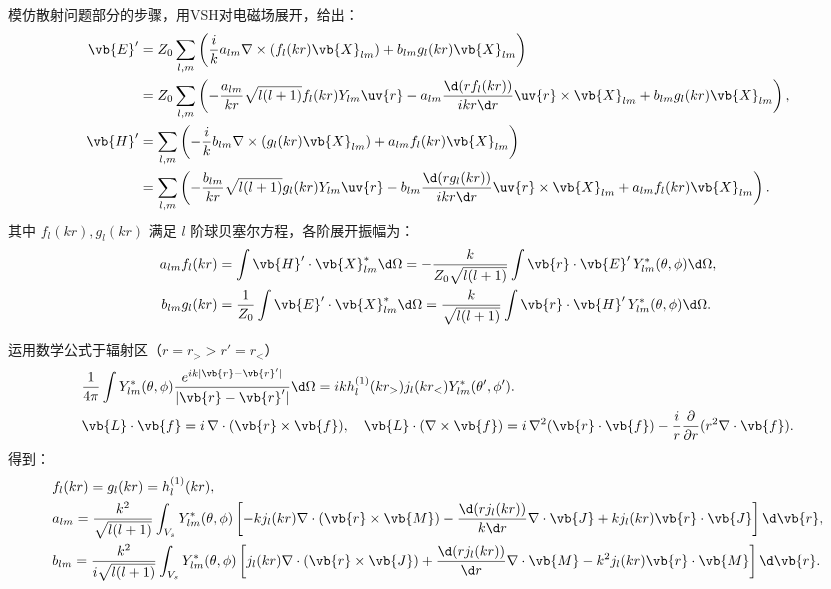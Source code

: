模仿散射问题部分的步骤，用VSH对电磁场展开，给出：
\begin{align*}
	\vb{E}' & = Z_0 \sum_{l,m} \left( \frac{i}{k} a_{lm} \nabla \times \left( f_l(kr) \vb{X}_{lm} \right) + b_{lm} g_l(kr) \vb{X}_{lm} \right)                                                       \\
	        & = Z_0 \sum_{l,m} \left( -\frac{a_{lm}}{k r} \sqrt{l(l+1)} f_l(kr) Y_{lm} \uv{r} - a_{lm} \frac{\d(r f_l(kr))}{ikr\d r} \uv{r} \times \vb{X}_{lm} + b_{lm} g_l(kr) \vb{X}_{lm} \right), \\
	\vb{H}' & = \sum_{l,m} \left( -\frac{i}{k} b_{lm} \nabla \times \left( g_l(kr) \vb{X}_{lm} \right) + a_{lm} f_l(kr) \vb{X}_{lm} \right)                                                          \\
	        & = \sum_{l,m} \left( -\frac{b_{lm}}{k r} \sqrt{l(l+1)} g_l(kr) Y_{lm} \uv{r} -  b_{lm} \frac{\d(r g_l(kr))}{ikr\d r} \uv{r} \times \vb{X}_{lm} + a_{lm} f_l(kr) \vb{X}_{lm} \right).
\end{align*}
其中 \(f_l(kr), g_l(kr)\) 满足 \(l\) 阶球贝塞尔方程，各阶展开振幅为：
\begin{align*}
	a_{lm} f_l(kr) &= \int \vb{H}' \cdot \vb{X}_{lm}^\ast \d \Omega = -\frac{k}{Z_0 \sqrt{l(l+1)}} \int \vb{r} \cdot \vb{E}'\, Y_{lm}^\ast (\theta, \phi) \d \Omega,\\
	b_{lm} g_l(kr) &=\frac{1}{Z_0} \int \vb{E}' \cdot \vb{X}_{lm}^\ast \d \Omega = \frac{k}{\sqrt{l(l+1)}} \int \vb{r} \cdot \vb{H}'\, Y_{lm}^\ast (\theta, \phi) \d \Omega.
\end{align*}

运用数学公式于辐射区（\(r = r_> > r' = r_<\)）
\begin{align*}
	&\frac{1}{4 \pi} \int Y_{lm}^\ast (\theta, \phi) \frac{e^{i k |\vb{r} - \vb{r}'|}}{|\vb{r} - \vb{r}'|} \d \Omega = i k h_l^{(1)}(k r_>) j_l(k r_<) Y_{lm}^\ast (\theta', \phi').\\
	&\vb{L} \cdot \vb{f} = i \,\nabla \cdot (\vb{r} \times \vb{f}),\quad
	\vb{L} \cdot (\nabla \times \vb{f}) = i \,\nabla^2 (\vb{r} \cdot \vb{f}) - \frac{i}{r} \frac{\partial}{\partial r} (r^2 \nabla \cdot \vb{f}).
\end{align*}
得到：
\begin{align*}
	&f_l(kr) = g_l(kr) = h_l^{(1)}(kr),\\
	&a_{lm} = \frac{k^2}{\sqrt{l(l+1)}} \int_{V_s} Y_{lm}^\ast (\theta, \phi) \left[ -k j_l(kr) \nabla \cdot (\vb{r} \times \vb{M}) - \frac{\d(r j_l(kr))}{k \d r} \nabla \cdot \vb{J} + k j_l(kr) \vb{r} \cdot \vb{J} \right] \d \vb{r},\\
	&b_{lm} = \frac{k^2}{i \sqrt{l(l+1)}} \int_{V_s} Y_{lm}^\ast (\theta, \phi) \left[ j_l(kr) \nabla \cdot (\vb{r} \times \vb{J}) + \frac{\d(r j_l(kr))}{\d r} \nabla \cdot \vb{M} - k^2 j_l(kr) \vb{r} \cdot \vb{M} \right] \d \vb{r}.
\end{align*}

